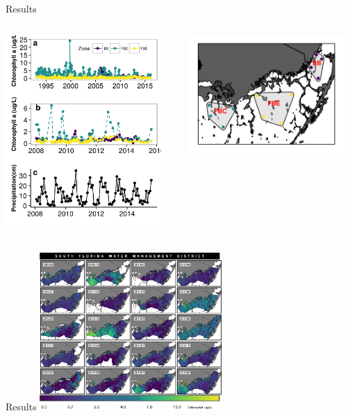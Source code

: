 \documentclass[compress,noflama,nosectionpages]{beamer}
\begin{document}
		\begin{frame}{Results}
			\begin{columns}
				\begin{column}{6cm}
					\includegraphics[height=7.4cm,keepaspectratio=true]{figures/chltimeseries.png}\\
				\end{column}
				\begin{column}{5cm}
					\includegraphics[height=4.5cm,clip=true,trim = 0mm 0mm 0mm 0mm,keepaspectratio=true]{figures/fbmap_wqmn.png}%
				\end{column}
			\end{columns}
		\end{frame}

		\begin{frame}{Results}
			\includegraphics[height=6cm,keepaspectratio=true]{figures/multipanel.png}\\
		\end{frame}
\end{document}
